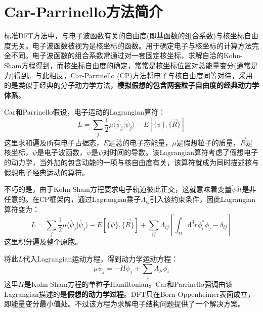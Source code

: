 

\section{Car-Parrinello方法简介}
标准\textrm{DFT}方法中，与电子波函数有关的自由度(即基函数的组合系数)与核坐标自由度无关。电子波函数被视为是核坐标的函数。用于确定电子与核坐标的计算方法完全不同。电子波函数的组合系数常通过对一套固定核坐标，求解自洽的\textrm{Kohn-Sham}方程得到，而核坐标自由度的确定，常常是核坐标位置对总能量变分(通常是力)得到。与此相反，\textrm{Car-Parrinello (CP)}方法将电子与核自由度同等对待，采用的是类似于经典的分子动力学方法，\textbf{模拟假想的包含两套粒子自由度的经典动力学体系}。

\textrm{Car}和\textrm{Parrinello}假设，电子运动的\textrm{Lagrangian}算符：
\begin{equation}
	L=\sum_j\dfrac12\mu\langle\dot{\psi_j}|\dot{\psi_j}\rangle-E[\{\psi\},\{\vec R\}]
	\label{eq:Lagrangian_orig}
\end{equation}
这里求和遍及所有电子占据态，$E$是总的电子态能量，$\mu$是假想粒子的质量，$\vec R$是核坐标，$\psi$是电子波函数，$\dot{\psi}$是$\psi$对时间的导数。该\textrm{Lagrangian}算符考虑了假想电子的动力学，当外加的包含动能的一项与核自由度有关，该算符就成为同时描述核与假想电子经典运动的算符。

不巧的是，由于\textrm{Kohn-Sham}方程要求电子轨道彼此正交，这就意味着变量$\dot{\psi}\delta t$是非任意的。在\textrm{CP}框架内，通过\textrm{Lagrangian}乘子$\Lambda_{ij}$引入该约束条件，因此\textrm{Lagrangian}算符变为：
\begin{equation}
	L=\sum_j\dfrac12\mu\langle\dot{\psi_j}|\dot{\psi_j}\rangle-E[\{\psi\},\{\vec R\}]+\sum_{ij}\Lambda_{ij}[\int_{\Omega}\mathrm{d}^3r\phi_i^{\ast}\phi_j-\delta_{ij}]
	\label{eq:Lagrangian}
\end{equation}
这里积分遍及整个原胞。

将此$L$代入\textrm{Lagrangian}运动方程，得到动力学运动方程：
\begin{equation}
	\mu\ddot{\psi_j}=-H\psi_j+\sum_i\Lambda_{ji}\phi_i
	\label{eq:dynamical_equation}
\end{equation}
这里$H$是\textrm{Kohn-Sham}方程的单粒子\textrm{Hamiltonian}。\textrm{Car}和\textrm{Parrinello}强调由该\textrm{Lagrangian}描述的是\textbf{假想的动力学过程}。\textrm{DFT}只在\textrm{Born-Oppenheimer}表面成立，即能量变分最小值处。不过该方程为求解电子结构问题提供了一个解决方案。

